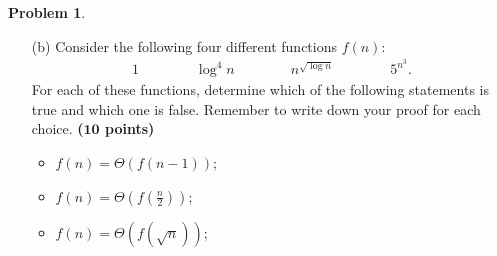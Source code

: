 \documentclass{article}
\theoremstyle{definition}
\newtheorem{problem}{Problem}
\def\fline{\rule{0.75\linewidth}{0.5pt}}
\newcommand{\finishline}{
  \begin{center}\fline
\end{center}}
\newtheorem*{solution*}{Solution}
\newenvironment{solution}{
\begin{solution*}}{{\finishline}
\end{solution*}}
\newcommand{\grade}[1]{\hfill{\textbf{($\mathbf{#1}$ points)}}}
\begin{document}
\begin{problem}
\begin{enumerate}
\begin{solution}
\begin{itemize}
            My proof is as follows:

            $ e^n = O(3^n)$ because $3>e$
          \item $3^n$

            My proof is as follows:

            $ e^n = O(10^n)$ because $10>3$
          \item $10^{n}$

            My proof is as follows:
            $10^n = O(n!)$ because as n goes to infinity we begin to multiply by numbers much larger than 10 a very large number of times, causing us to overtake the constant multiplication by a factor of 10 of $10^n$

          \item $n!$

            My proof is as follows:

            n factorial multiplies n times by numbers that steadily get smaller than n. $n^n$ multiplies by exactly n just as many times as n factorial. Therefore it must always be bigger.

          \item $n^n$

            My proof is as follows:

            $log n^n = log (2^{n^2})$ if we ignore the bases we get

            $ n = 2^n$

            Which is clearly bigger than just n
          \item $2^{n^2}$
          \item \textbf{Largest}
        \end{itemize}
      \end{solution}

    \item[(b)]  Consider the following four different functions $f(n)$:
      \begin{align*}
        1 \qquad\qquad  \log^4{n} \qquad\qquad  n^{\sqrt{\log n}}  \qquad\qquad 5^{n^3}.
      \end{align*}
      For each of these functions, determine which of the following statements is true and which one is false. Remember to write down your proof for each choice.    \grade{10}
      \begin{itemize}
        \item $f(n) = \Theta(f(n-1))$;
        \item $f(n) = \Theta(f(\frac{n}{2}))$;
        \item $f(n) = \Theta(f(\sqrt n))$;
      \end{itemize}


\end{enumerate}
\end{problem}
\end{document}
